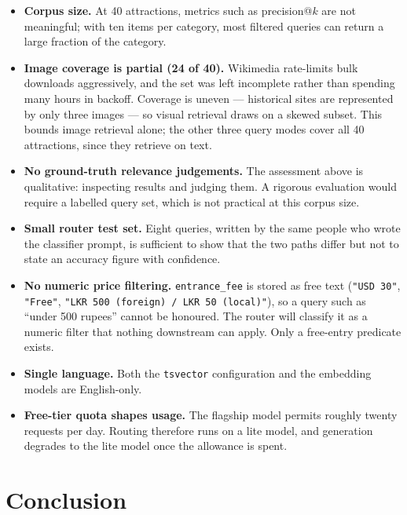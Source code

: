 \documentclass[11pt,a4paper]{article}
\begin{document}
\begin{itemize}[itemsep=3pt]
  \item \textbf{Corpus size.} At 40 attractions, metrics such as precision@$k$
        are not meaningful; with ten items per category, most filtered queries
        can return a large fraction of the category.
  \item \textbf{Image coverage is partial (24 of 40).} Wikimedia rate-limits
        bulk downloads aggressively, and the set was left incomplete rather than
        spending many hours in backoff. Coverage is uneven --- historical sites
        are represented by only three images --- so visual retrieval draws on a
        skewed subset. This bounds image retrieval alone; the other three query
        modes cover all 40 attractions, since they retrieve on text.
  \item \textbf{No ground-truth relevance judgements.} The assessment above is
        qualitative: inspecting results and judging them. A rigorous evaluation
        would require a labelled query set, which is not practical at this
        corpus size.
  \item \textbf{Small router test set.} Eight queries, written by the same
        people who wrote the classifier prompt, is sufficient to show that the
        two paths differ but not to state an accuracy figure with confidence.
  \item \textbf{No numeric price filtering.} \texttt{entrance\_fee} is stored as
        free text (\texttt{"USD 30"}, \texttt{"Free"}, \texttt{"LKR 500
        (foreign) / LKR 50 (local)"}), so a query such as ``under 500 rupees''
        cannot be honoured. The router will classify it as a numeric filter that
        nothing downstream can apply. Only a free-entry predicate exists.
  \item \textbf{Single language.} Both the \texttt{tsvector} configuration and
        the embedding models are English-only.
  \item \textbf{Free-tier quota shapes usage.} The flagship model permits
        roughly twenty requests per day. Routing therefore runs on a lite model,
        and generation degrades to the lite model once the allowance is spent.
\end{itemize}

\section{Conclusion}
\end{document}
